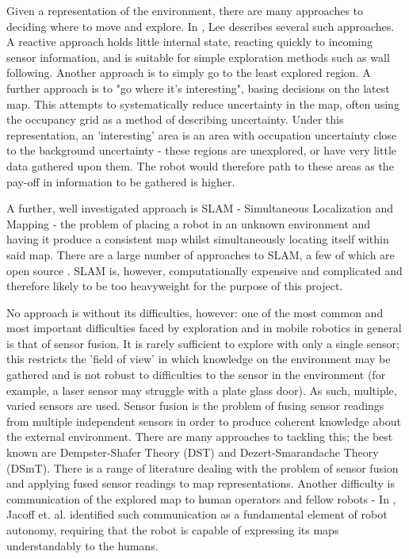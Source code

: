\documentclass[authoryearcitations]{UoYCSproject}
\begin{document}
Given a representation of the environment, there are many approaches to deciding where to move and explore. In \cite[chapter 4, p.~37]{lee}, Lee describes several such approaches. A reactive approach holds little internal state, reacting quickly to incoming sensor information, and is suitable for simple exploration methods such as wall following. Another approach is to simply go to the least explored region. A further approach is to "go where it's interesting", basing decisions on the latest map. This attempts to systematically reduce uncertainty in the map, often using the occupancy grid as a method of describing uncertainty. Under this representation, an 'interesting' area is an area with occupation uncertainty close to the background uncertainty - these regions are unexplored, or have very little data gathered upon them. The robot would therefore path to these areas as the pay-off in information to be gathered is higher.

A further, well investigated approach is SLAM - Simultaneous Localization and Mapping - the problem of placing a robot in an unknown environment and having it produce a consistent map whilst simultaneously locating itself within said map\cite[p.~99]{slam}. There are a large number of approaches to SLAM, a few of which are open source \cite[p.~107]{slam}. SLAM is, however, computationally expensive and complicated and therefore likely to be too heavyweight for the purpose of this project.

No approach is without its difficulties, however: one of the most common and most important difficulties faced by exploration and in mobile robotics in general is that of sensor fusion. It is rarely sufficient to explore with only a single sensor; this restricts the 'field of view' in which knowledge on the environment may be gathered and is not robust to difficulties to the sensor in  the environment (for example, a laser sensor may struggle with a plate glass door). As such, multiple, varied sensors are used. Sensor fusion is the problem of fusing sensor readings from multiple independent sensors in order to produce coherent knowledge about the external environment. There are many approaches to tackling this; the best known are Dempster-Shafer Theory (DST) and Dezert-Smarandache Theory (DSmT). There is a range of literature dealing with the problem of sensor fusion and applying fused sensor readings to map representations. Another difficulty is communication of the explored map to human operators and fellow robots - In \cite{jacoff}, Jacoff et. al. identified such communication as a fundamental element of robot autonomy, requiring that the robot is capable of expressing its maps understandably to the humans.
\end{document}
